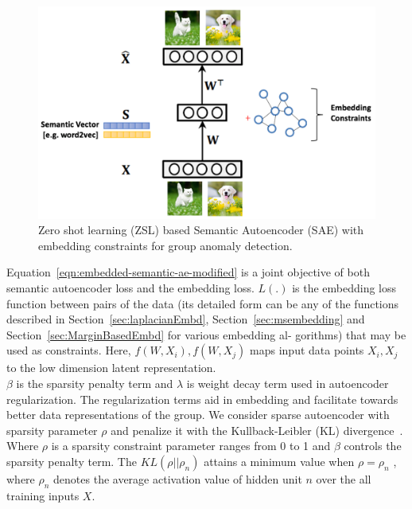 \begin{figure}[t]
\includegraphics[scale=0.55]{images/SemanticAE_WithEmbeddingConstraints}
\centering
\caption{Zero shot learning (ZSL) based Semantic Autoencoder (SAE) with embedding constraints for group anomaly detection. }
\label{fig:ZSL_SAE_Embedding}
\end{figure}


Equation~\ref{eqn:embedded-semantic-ae-modified} is a joint objective of both semantic autoencoder loss and the embedding loss. $L(.)$ is the embedding loss function between pairs of the data (its detailed
form can be any of the functions described in Section~\ref{sec:laplacianEmbd}, Section~\ref{sec:msembedding} and Section~\ref{sec:MarginBasedEmbd} for various embedding al-
gorithms) that may be used as constraints. Here, $f(W,X_i),f(W,X_j)$ maps input data points $X_i,X_j$ to the low dimension latent representation. \\
$\beta$ is the sparsity penalty term  and $\lambda$ is weight decay term  used in autoencoder regularization. The regularization terms aid in embedding and facilitate towards better data representations of the group.
We consider sparse autoencoder with sparsity parameter $\rho$ and penalize it with the Kullback-Leibler (KL) divergence~\cite{hinton2012practical}. Where $\rho$ is a sparsity constraint parameter ranges from 0 to 1 and $\beta$ controls the sparsity penalty term. The $KL(\rho||\rho_n )$ attains a minimum value when $\rho = \rho_n$ , where $\rho_n$ denotes the average activation value of hidden unit $n$ over the all training inputs $X$.


